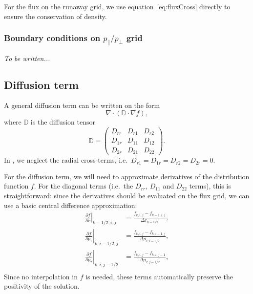 \documentclass{notes}
\begin{document}
    For the flux on the runaway grid, we use equation~\eqref{eq:fluxCross}
    directly to ensure the conservation of density.

    \subsubsection{Boundary conditions on $p_\parallel / p_\perp$ grid}
    \emph{To be written...}

    \subsection{Diffusion term}\label{sec:diffusion}
    A general diffusion term can be written on the form
    \begin{equation*}
        \nabla\cdot\left( \mathbb{D}\cdot\nabla f \right),
    \end{equation*}
    where $\mathbb{D}$ is the diffusion tensor
    \begin{equation*}
        \mathbb{D} = \begin{pmatrix}
            D_{rr} & D_{r1} & D_{r2} \\
            D_{1r} & D_{11} & D_{12} \\
            D_{2r} & D_{21} & D_{22}
        \end{pmatrix}.
    \end{equation*}
    In \DREAM, we neglect the radial cross-terms, i.e.\
    $D_{r1} = D_{1r} = D_{r2} = D_{2r} = 0$.

    For the diffusion term, we will need to approximate derivatives of the
    distribution function $f$. For the diagonal terms (i.e.\ the $D_{rr}$,
    $D_{11}$ and $D_{22}$ terms), this is straightforward: since the derivatives
    should be evaluated on the flux grid, we can use a basic central difference
    approximation:
    \begin{align}
        \left.\frac{\partial f}{\partial r}\right|_{k-1/2,i,j} &=
            \frac{f_{k,i,j} - f_{k-1,i,j}}{\Delta r_{k-1/2}},\\
        \left.\frac{\partial f}{\partial p_1}\right|_{k,i-1/2,j} &=
            \frac{f_{k,i,j} - f_{k,i-1,j}}{\Delta p_{1; i-1/2}},\\
        \left.\frac{\partial f}{\partial p_2}\right|_{k,i,j-1/2} &=
            \frac{f_{k,i,j} - f_{k,i,j-1}}{\Delta p_{2; j-1/2}},\\
    \end{align}
    Since no interpolation in $f$ is needed, these terms automatically preserve
    the positivity of the solution.
\end{document}
